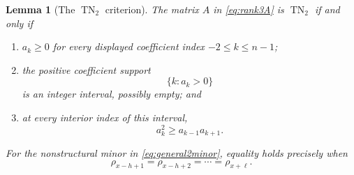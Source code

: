 \documentclass{amsart}
\numberwithin{equation}{section}
\newtheorem{lemma}[theorem]{Lemma}
\theoremstyle{definition}
\theoremstyle{remark}
\DeclareMathOperator{\TN}{TN}
\begin{document}
\begin{lemma}[The $\TN_2$ criterion]\label{lem:TN2criterion}
The matrix $A$ in \eqref{eq:rank3A} is $\TN_2$ if and only if
\begin{enumerate}
\item $a_k\ge0$ for every displayed coefficient index $-2\le k\le n-1$;
\item the positive coefficient support
\[
 \{k:a_k>0\}
\]
is an integer interval, possibly empty; and
\item at every interior index of this interval,
\begin{equation}\label{eq:logconcavity}
 a_k^2\ge a_{k-1}a_{k+1}.
\end{equation}
\end{enumerate}
For the nonstructural minor in \eqref{eq:general2minor}, equality holds precisely when
\[
 \rho_{x-h+1}=\rho_{x-h+2}=\cdots=\rho_{x+\ell}.
\]
\end{lemma}
\end{document}
